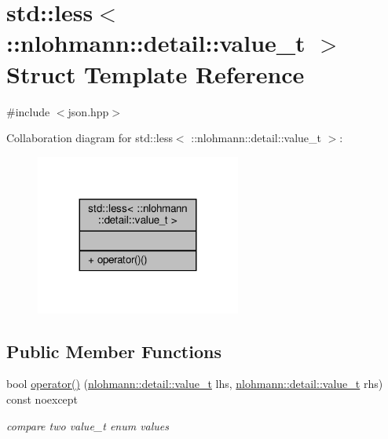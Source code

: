 \hypertarget{structstd_1_1less_3_01_1_1nlohmann_1_1detail_1_1value__t_01_4}{}\section{std\+:\+:less$<$ \+:\+:nlohmann\+:\+:detail\+:\+:value\+\_\+t $>$ Struct Template Reference}
\label{structstd_1_1less_3_01_1_1nlohmann_1_1detail_1_1value__t_01_4}


{\ttfamily \#include $<$json.\+hpp$>$}



Collaboration diagram for std\+:\+:less$<$ \+:\+:nlohmann\+:\+:detail\+:\+:value\+\_\+t $>$\+:
\nopagebreak
\begin{figure}[H]
\begin{center}
\leavevmode
\includegraphics[width=191pt]{structstd_1_1less_3_01_1_1nlohmann_1_1detail_1_1value__t_01_4__coll__graph}
\end{center}
\end{figure}
\subsection*{Public Member Functions}
\begin{DoxyCompactItemize}
\item 
bool \hyperlink{structstd_1_1less_3_01_1_1nlohmann_1_1detail_1_1value__t_01_4_a76d2a6c170cfd74f3b1882be1b5a6671}{operator()} (\hyperlink{namespacenlohmann_1_1detail_a1ed8fc6239da25abcaf681d30ace4985}{nlohmann\+::detail\+::value\+\_\+t} lhs, \hyperlink{namespacenlohmann_1_1detail_a1ed8fc6239da25abcaf681d30ace4985}{nlohmann\+::detail\+::value\+\_\+t} rhs) const noexcept
\begin{DoxyCompactList}\small\item\em compare two value\+\_\+t enum values \end{DoxyCompactList}\end{DoxyCompactItemize}


